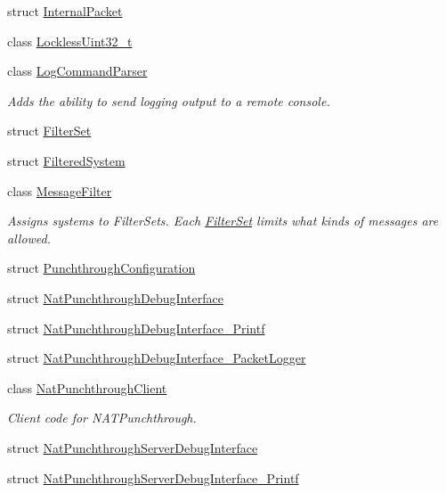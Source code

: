 \begin{DoxyCompactItemize}
struct \hyperlink{struct_rak_net_1_1_internal_packet}{Internal\-Packet}
\item 
class \hyperlink{class_rak_net_1_1_lockless_uint32__t}{Lockless\-Uint32\-\_\-t}
\item 
class \hyperlink{class_rak_net_1_1_log_command_parser}{Log\-Command\-Parser}
\begin{DoxyCompactList}\small\item\em Adds the ability to send logging output to a remote console. \end{DoxyCompactList}\item 
struct \hyperlink{struct_rak_net_1_1_filter_set}{Filter\-Set}
\item 
struct \hyperlink{struct_rak_net_1_1_filtered_system}{Filtered\-System}
\item 
class \hyperlink{class_rak_net_1_1_message_filter}{Message\-Filter}
\begin{DoxyCompactList}\small\item\em Assigns systems to Filter\-Sets. Each \hyperlink{struct_rak_net_1_1_filter_set}{Filter\-Set} limits what kinds of messages are allowed. \end{DoxyCompactList}\item 
struct \hyperlink{struct_rak_net_1_1_punchthrough_configuration}{Punchthrough\-Configuration}
\item 
struct \hyperlink{struct_rak_net_1_1_nat_punchthrough_debug_interface}{Nat\-Punchthrough\-Debug\-Interface}
\item 
struct \hyperlink{struct_rak_net_1_1_nat_punchthrough_debug_interface___printf}{Nat\-Punchthrough\-Debug\-Interface\-\_\-\-Printf}
\item 
struct \hyperlink{struct_rak_net_1_1_nat_punchthrough_debug_interface___packet_logger}{Nat\-Punchthrough\-Debug\-Interface\-\_\-\-Packet\-Logger}
\item 
class \hyperlink{class_rak_net_1_1_nat_punchthrough_client}{Nat\-Punchthrough\-Client}
\begin{DoxyCompactList}\small\item\em Client code for N\-A\-T\-Punchthrough. \end{DoxyCompactList}\item 
struct \hyperlink{struct_rak_net_1_1_nat_punchthrough_server_debug_interface}{Nat\-Punchthrough\-Server\-Debug\-Interface}
\item 
struct \hyperlink{struct_rak_net_1_1_nat_punchthrough_server_debug_interface___printf}{Nat\-Punchthrough\-Server\-Debug\-Interface\-\_\-\-Printf}

\end{DoxyCompactItemize}

